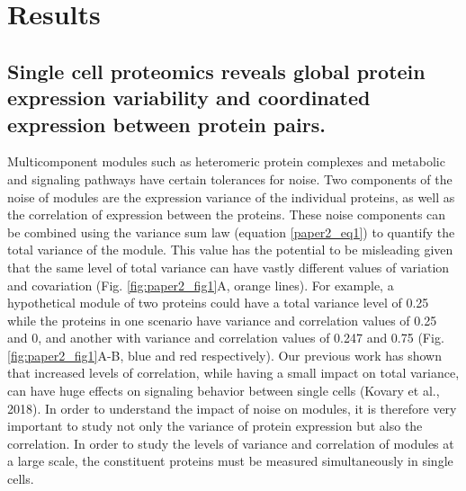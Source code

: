 \section{Results}
\subsection{Single cell proteomics reveals global protein expression variability and coordinated expression between protein pairs.}

Multicomponent modules such as heteromeric protein complexes and metabolic and signaling pathways have certain tolerances for noise. Two components of the noise of modules are the expression variance of the individual proteins, as well as the correlation of expression between the proteins. These noise components can be combined using the variance sum law (equation \ref{paper2_eq1}) to quantify the total variance of the module. This value has the potential to be misleading given that the same level of total variance can have vastly different values of variation and covariation (Fig. \ref{fig:paper2_fig1}A, orange lines). For example, a hypothetical module of two proteins could have a total variance level of 0.25 while the proteins in one scenario have variance and correlation values of 0.25 and 0, and another with variance and correlation values of 0.247 and 0.75 (Fig. \ref{fig:paper2_fig1}A-B, blue and red respectively). Our previous work has shown that increased levels of correlation, while having a small impact on total variance, can have huge effects on signaling behavior between single cells (Kovary et al., 2018). In order to understand the impact of noise on modules, it is therefore very important to study not only the variance of protein expression but also the correlation. In order to study the levels of variance and correlation of modules at a large scale, the constituent proteins must be measured simultaneously in single cells.

